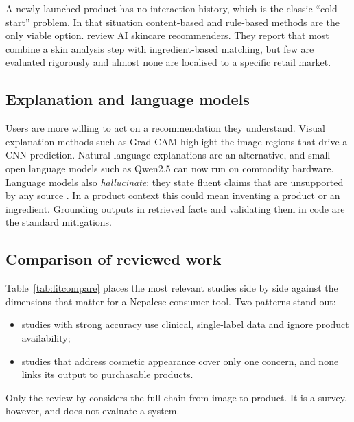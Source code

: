 A newly launched product has no interaction history, which is the classic ``cold start'' problem. In that situation content-based and rule-based methods are the only viable option. \citet{ramrakhiani2024} review AI skincare recommenders. They report that most combine a skin analysis step with ingredient-based matching, but few are evaluated rigorously and almost none are localised to a specific retail market.

\subsection*{Explanation and language models}

Users are more willing to act on a recommendation they understand. Visual explanation methods such as Grad-CAM \citep{selvaraju2020} highlight the image regions that drive a CNN prediction. Natural-language explanations are an alternative, and small open language models such as Qwen2.5 \citep{qwen2024} can now run on commodity hardware. Language models also \emph{hallucinate}: they state fluent claims that are unsupported by any source \citep{ji2023}. In a product context this could mean inventing a product or an ingredient. Grounding outputs in retrieved facts and validating them in code are the standard mitigations.

\subsection*{Comparison of reviewed work}

Table~\ref{tab:litcompare} places the most relevant studies side by side against the dimensions that matter for a Nepalese consumer tool. Two patterns stand out:
\begin{itemize}
  \item studies with strong accuracy use clinical, single-label data and ignore product availability;
  \item studies that address cosmetic appearance cover only one concern, and none links its output to purchasable products.
\end{itemize}
Only the review by \citet{ramrakhiani2024} considers the full chain from image to product. It is a survey, however, and does not evaluate a system.

